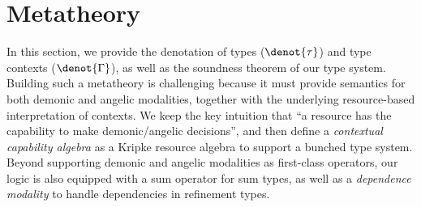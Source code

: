 \section{Metatheory}\label{sec:meta}

In this section, we provide the denotation of types ($\denot{\tau}$)
and type contexts ($\denot{\Gamma}$), as well as the soundness theorem
of our type system.  Building such a metatheory is challenging because
it must provide semantics for both demonic and angelic modalities,
together with the underlying resource-based interpretation of
contexts.  We keep the key intuition that ``a resource has the
capability to make demonic/angelic decisions'', and then define a
\emph{contextual capability algebra} as a Kripke resource algebra to
support a bunched type system.  Beyond supporting demonic and angelic
modalities as first-class operators, our logic is also equipped with a
sum operator for sum types, as well as a \emph{dependence modality} to
handle dependencies in refinement types. 




